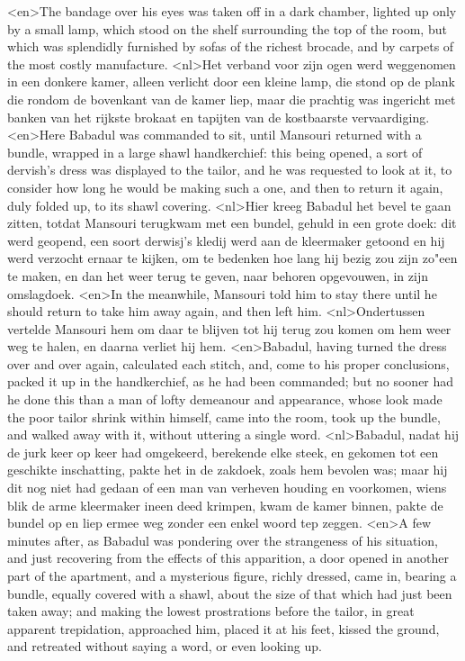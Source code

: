 <en>The bandage over his eyes was taken off in a dark chamber, lighted up only by a small lamp, which stood on the shelf surrounding the top of the room, but which was splendidly furnished by sofas of the richest brocade, and by carpets of the most costly manufacture.
<nl>Het verband voor zijn ogen werd weggenomen in een donkere kamer, alleen verlicht door een kleine lamp, die stond op de plank die rondom de bovenkant van de kamer liep, maar die prachtig was ingericht met banken van het rijkste brokaat en tapijten van de  kostbaarste vervaardiging.
<en>Here Babadul was commanded to sit, until Mansouri returned with a bundle, wrapped in a large shawl handkerchief: this being opened, a sort of dervish's dress was displayed to the tailor, and he was requested to look at it, to consider how long he would be making such a one, and then to return it again, duly folded up, to its shawl covering.
<nl>Hier kreeg Babadul het bevel te gaan zitten, totdat Mansouri  terugkwam met een bundel, gehuld in een grote doek: dit werd geopend, een soort derwisj's kledij werd aan de kleermaker getoond en hij werd verzocht ernaar te kijken, om te bedenken hoe lang hij bezig zou zijn zo"een te maken, en dan het  weer terug te geven, naar behoren opgevouwen, in zijn omslagdoek.
<en>In the meanwhile, Mansouri told him to stay there until he should return to take him away again, and then left him.
<nl>Ondertussen vertelde Mansouri hem om daar te blijven tot hij terug zou komen om hem weer weg te halen, en daarna verliet hij hem.
<en>Babadul, having turned the dress over and over again, calculated each stitch, and, come to his proper conclusions, packed it up in the handkerchief, as he had been commanded; but no sooner had he done this than a man of lofty demeanour and appearance, whose look made the poor tailor shrink within himself, came into the room, took up the bundle, and walked away with it, without uttering a single word.
<nl>Babadul, nadat hij de jurk keer op keer had omgekeerd, berekende elke steek, en gekomen tot een geschikte inschatting, pakte het in de zakdoek, zoals hem bevolen was; maar  hij dit nog niet had gedaan of een man  van verheven houding en voorkomen, wiens blik de arme kleermaker ineen deed krimpen, kwam de kamer binnen, pakte de bundel op en liep ermee weg zonder een enkel woord tep zeggen.
<en>A few minutes after, as Babadul was pondering over the strangeness of his situation, and just recovering from the effects of this apparition, a door opened in another part of the apartment, and a mysterious figure, richly dressed, came in, bearing a bundle, equally covered with a shawl, about the size of that which had just been taken away; and making the lowest prostrations before the tailor, in great apparent trepidation, approached him, placed it at his feet, kissed the ground, and retreated without saying a word, or even looking up.
